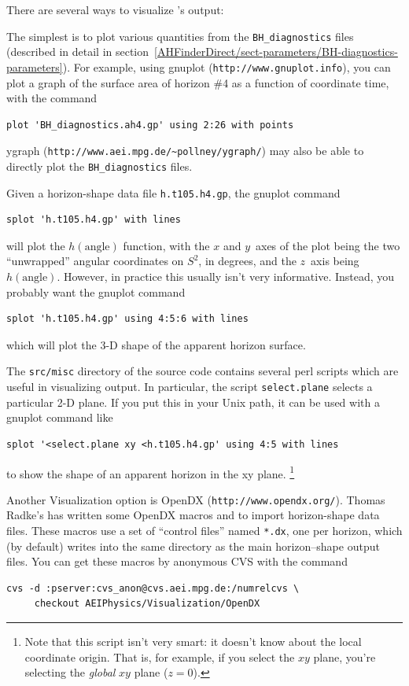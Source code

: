 There are several ways to visualize 's output:

The simplest is to plot various quantities from the
\verb|BH_diagnostics| files (described in detail in
section~\ref{AHFinderDirect/sect-parameters/BH-diagnostics-parameters}).
For example, using gnuplot (\verb|http://www.gnuplot.info|), you can
plot a graph of the surface area of horizon \#4 as a function of
coordinate time, with the command
\begin{verbatim}
plot 'BH_diagnostics.ah4.gp' using 2:26 with points
\end{verbatim}
ygraph (\verb|http://www.aei.mpg.de/~pollney/ygraph/|) may also be
able to directly plot the \verb|BH_diagnostics| files.

Given a horizon-shape data file \verb|h.t105.h4.gp|, the gnuplot
command
\begin{verbatim}
splot 'h.t105.h4.gp' with lines
\end{verbatim}
will plot the $h(\text{angle})$ function, with the $x$ and $y$~axes
of the plot being the two ``unwrapped'' angular coordinates on $S^2$,
in degrees, and the $z$~axis being $h(\text{angle})$.  However,
in practice this usually isn't very informative.  Instead, you
probably want the gnuplot command
\begin{verbatim}
splot 'h.t105.h4.gp' using 4:5:6 with lines
\end{verbatim}
which will plot the 3-D shape of the apparent horizon surface.

The \verb|src/misc| directory of the  source
code contains several perl scripts which are useful in visualizing
 output.  In particular, the script \verb|select.plane|
selects a particular 2-D plane.  If you put this in your Unix path,
it can be used with a gnuplot command like
\begin{verbatim}
splot '<select.plane xy <h.t105.h4.gp' using 4:5 with lines
\end{verbatim}
to show the shape of an apparent horizon in the xy plane.%
\footnote{%
	 Note that this script isn't very smart: it doesn't
	 know about the  local coordinate
	 origin.  That is, for example, if you select the $xy$
	 plane, you're selecting the \emph{global} $xy$ plane
	 ($z=0$).
	 }%

Another Visualization option is OpenDX (\verb|http://www.opendx.org/|).
Thomas Radke's has written some OpenDX macros
and 
to import  horizon-shape data files.  
These macros use a set of ``control files'' named \verb|*.dx|,
one per horizon, which  (by default) writes
into the same directory as the main horizon--shape output files.
You can get these macros by anonymous CVS with the command
\begin{verbatim}
cvs -d :pserver:cvs_anon@cvs.aei.mpg.de:/numrelcvs \
     checkout AEIPhysics/Visualization/OpenDX
\end{verbatim}

